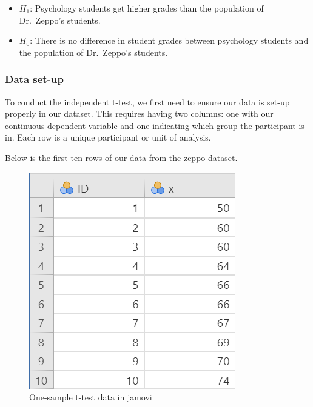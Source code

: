 \documentclass[
]{book}
\providecommand{\tightlist}{%
  \setlength{\itemsep}{0pt}\setlength{\parskip}{0pt}}
\begin{document}
\begin{itemize}
\tightlist
\item
  \(H_1\): Psychology students get higher grades than the population of Dr.~Zeppo's students.
\item
  \(H_0\): There is no difference in student grades between psychology students and the population of Dr.~Zeppo's students.
\end{itemize}

\hypertarget{data-set-up}{%
\subsubsection{Data set-up}\label{data-set-up}}

To conduct the independent t-test, we first need to ensure our data is set-up properly in our dataset. This requires having two columns: one with our continuous dependent variable and one indicating which group the participant is in. Each row is a unique participant or unit of analysis.

Below is the first ten rows of our data from the zeppo dataset.

\begin{figure}

{\centering \includegraphics[width=0.8\linewidth]{images/07.1-one_sample_t-test/data} 

}

\caption{One-sample t-test data in jamovi}\label{fig:unnamed-chunk-1}
\end{figure}
\end{document}
